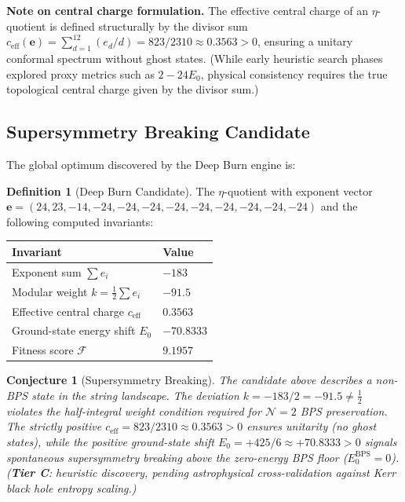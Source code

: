 \documentclass[11pt,a4paper]{article}
\theoremstyle{plain}
\newtheorem{conjecture}{Conjecture}
\theoremstyle{definition}
\newtheorem{definition}{Definition}
\theoremstyle{remark}
\newcommand{\tierC}{\textbf{Tier C}}
\begin{document}
\noindent \textbf{Note on central charge formulation.} The effective central charge of an $\eta$-quotient is defined structurally by the divisor sum $c_{\mathrm{eff}}(\mathbf{e}) = \sum_{d=1}^{12} (e_d / d) = 823/2310 \approx 0.3563 > 0$, ensuring a unitary conformal spectrum without ghost states. (While early heuristic search phases explored proxy metrics such as $2 - 24E_0$, physical consistency requires the true topological central charge given by the divisor sum.)

\subsection{Supersymmetry Breaking Candidate}\label{sec:susy}

The global optimum discovered by the Deep Burn engine is:

\begin{definition}[Deep Burn Candidate]
The $\eta$-quotient with exponent vector
$\mathbf{e} = (24, 23, -14, -24, -24, -24, -24, -24, -24, -24, -24, -24)$
and the following computed invariants:
\begin{center}
\begin{tabular}{ll}
\toprule
\textbf{Invariant} & \textbf{Value} \\
\midrule
Exponent sum $\sum e_i$ & $-183$ \\
Modular weight $k = \tfrac{1}{2}\sum e_i$ & $-91.5$ \\
Effective central charge $c_{\mathrm{eff}}$ & $0.3563$ \\
Ground-state energy shift $E_0$ & $-70.8333$ \\
Fitness score $\mathcal{F}$ & $9.1957$ \\
\bottomrule
\end{tabular}
\end{center}
\end{definition}

\begin{conjecture}[Supersymmetry Breaking]\label{conj:susy}
The candidate above describes a non-BPS state in the string landscape.
The deviation $k = -183/2 = -91.5 \neq \tfrac{1}{2}$ violates the half-integral
weight condition required for $\mathcal{N} = 2$ BPS preservation.
The strictly positive $c_{\mathrm{eff}} = 823/2310 \approx 0.3563 > 0$ ensures
unitarity (no ghost states), while the positive ground-state shift
$E_0 = +425/6 \approx +70.8333 > 0$ signals spontaneous supersymmetry
breaking above the zero-energy BPS floor ($E_0^{\mathrm{BPS}} = 0$).
(\tierC{}: heuristic discovery, pending astrophysical cross-validation
against Kerr black hole entropy scaling.)
\end{conjecture}
\end{document}
